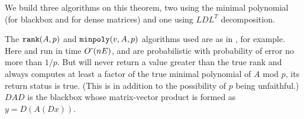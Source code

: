 \documentclass{acm_proc_article-sp}
\begin{document}
We build three algorithms on this theorem, two using the minimal polynomial (for blackbox
and for dense matrices) and one using $LDL^T$ decomposition.


The $\mbox{\tt rank}(A, p)$ and $\mbox{\tt minpoly}(v, A, p)$ algorithms 
used are as in \cite{Wie86, KS91, CEKSTV02}, for example.  
Here \minpoly{} and \rank{} run in time ${O\mskip1mu\tilde{\,}\mskip1mu}(nE)$, and 
are probabilistic with probability
of error no more than $1/p$.  But \rank{} will never return a value
greater than the true rank and \minpoly{} always computes at least a factor
of the true minimal polynomial of $A$ mod $p$, its return status is true. 
(This is in addition to the possibility of $p$ being unfaithful.) 
$DAD$ is the blackbox whose matrix-vector product is formed as $y = D(A(Dx))$.
\end{document}
